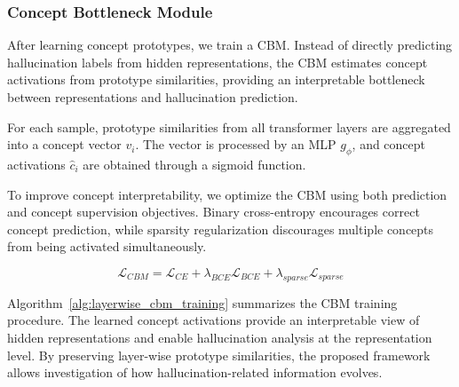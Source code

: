 \subsubsection{Concept Bottleneck Module}

After learning concept prototypes, we train a CBM. Instead of directly predicting hallucination labels from hidden representations, the CBM estimates concept activations from prototype similarities, providing an interpretable bottleneck between representations and hallucination prediction.

For each sample, prototype similarities from all transformer layers are aggregated into a concept vector $v_i$. The vector is processed by an MLP $g_\phi$, and concept activations $\hat{c}_i$ are obtained through a sigmoid function.

To improve concept interpretability, we optimize the CBM using both prediction and concept supervision objectives. Binary cross-entropy encourages correct concept prediction, while sparsity regularization discourages multiple concepts from being activated simultaneously.

\[
\mathcal{L}_{CBM}
=
\mathcal{L}_{CE}
+
\lambda_{BCE}\mathcal{L}_{BCE}
+
\lambda_{sparse}\mathcal{L}_{sparse}
\]

Algorithm~\ref{alg:layerwise_cbm_training} summarizes the CBM training procedure. The learned concept activations provide an interpretable view of hidden representations and enable hallucination analysis at the representation level. By preserving layer-wise prototype similarities, the proposed framework allows investigation of how hallucination-related information evolves.

